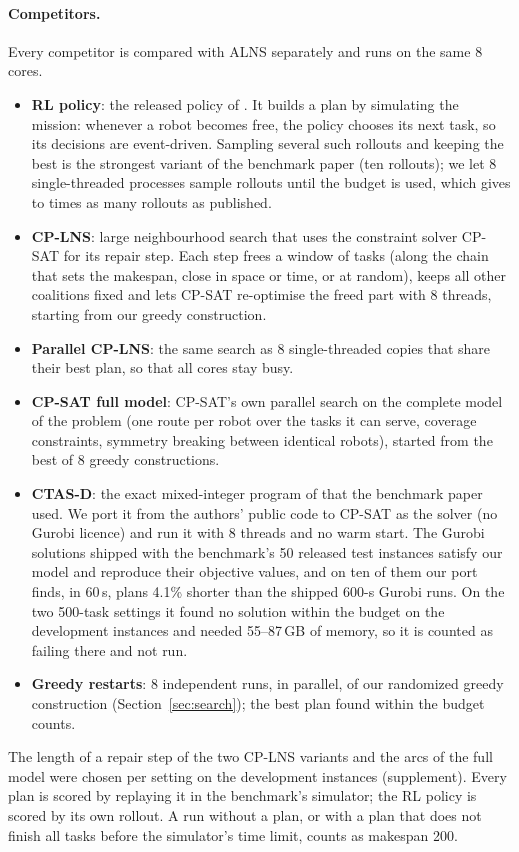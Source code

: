 \paragraph{Competitors.} Every competitor is compared with ALNS separately and runs on the same 8 cores.
\begin{itemize}
\item \textbf{RL policy}: the released policy of \citet{dai2025heterogeneous}. It builds a plan by simulating the
  mission: whenever a robot becomes free, the policy chooses its next task, so its decisions are event-driven.
  Sampling several such rollouts and keeping the best is the strongest variant of the benchmark paper (ten rollouts);
  we let 8 single-threaded processes sample rollouts until the budget is used, which gives \RLNlo{} to \RLNhi{} times
  as many rollouts as published.
\item \textbf{CP-LNS}: large neighbourhood search that uses the constraint solver CP-SAT \cite{perron2026cpsat} for its
  repair step. Each step frees a window of tasks (along the chain that sets the makespan, close in space or time, or
  at random), keeps all other coalitions fixed and lets CP-SAT re-optimise the freed part with 8 threads, starting
  from our greedy construction.
\item \textbf{Parallel CP-LNS}: the same search as 8 single-threaded copies that share their best plan, so that all
  cores stay busy.
\item \textbf{CP-SAT full model}: CP-SAT's own parallel search \cite{perron2023cpsatlp} on the complete model of the
  problem (one route per robot over the tasks it can serve, coverage constraints, symmetry breaking between identical
  robots), started from the best of 8 greedy constructions.
\item \textbf{CTAS-D}: the exact mixed-integer program of \citet{fu2023robust} that the benchmark paper used. We port
  it from the authors' public code to CP-SAT as the solver (no Gurobi licence) and run it with 8 threads and no warm
  start. The Gurobi solutions shipped with the benchmark's 50 released test instances satisfy our model and reproduce
  their objective values, and on ten of them our port finds, in 60\,s, plans 4.1\% shorter than the shipped 600-s
  Gurobi runs. On the two 500-task settings it found no solution within the budget on the development instances and
  needed 55--87\,GB of memory, so it is counted as failing there and not run.
\item \textbf{Greedy restarts}: 8 independent runs, in parallel, of our randomized greedy construction
  (Section~\ref{sec:search}); the best plan found within the budget counts.
\end{itemize}
The length of a repair step of the two CP-LNS variants and the arcs of the full model were chosen per setting on the
development instances (supplement). Every plan is scored by replaying it in the benchmark's simulator; the RL policy is
scored by its own rollout. A run without a plan, or with a plan that does not finish all tasks before the simulator's
time limit, counts as makespan 200.

